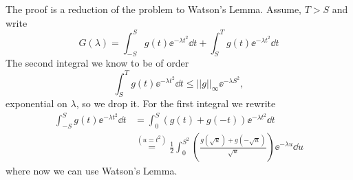 \begin{Mproof}
	The proof is a reduction of the problem to Watson's Lemma. Assume, $T>S$ and write
	$$G(\lambda) = \int_{-S}^{S} g(t) \ee^{-\lambda t^2} \dd t + \int_{S}^{T} g(t) \ee^{-\lambda t^2} \dd t $$
	The second integral we know to be of order
	$$\int_{S}^{T} g(t) \ee^{-\lambda t^2} \dd t \leq ||g||_{\infty} \ee^{-\lambda S^2},$$
	exponential on $\lambda$, so we drop it. For the first integral we rewrite
	\begin{equation*}
		\begin{split}
			\int_{-S}^{S} g(t) \ee^{-\lambda t^2} \dd t & = \int_{0}^{S} (g(t) + g(-t)) \ee^{-\lambda t^2}\dd t \\
			& \stackrel{(u= t^2)}{=} \frac{1}{2} \int_{0}^{S^2} \left(\frac{g\left(\sqrt{u}\right) + g\left(-\sqrt{u}\right)}{\sqrt{u}}\right) \ee^{-\lambda u} \dd u
		\end{split}
	\end{equation*}
	where now we can use Watson's Lemma.
\end{Mproof}
